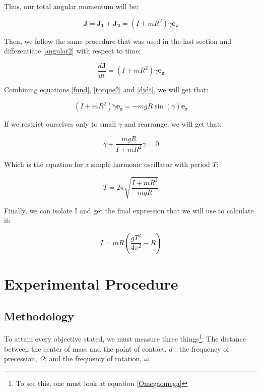 \documentclass[a4paper,12pt]{article}
\begin{document}
Thus, our total angular momentum will be:

\begin{equation}
	\label{angular2}
	\boldsymbol{J} = \boldsymbol{J_1} + \boldsymbol{J_2} = \left(I + mR^2\right) \dot{\gamma} \boldsymbol{e_z} 
\end{equation}

Then, we follow the same procedure that was used in the last section and differentiate \ref{angular2} with respect to time:

\begin{equation}
	\label{djdt}
	\frac{d\boldsymbol{J}}{dt} =\left(I + mR^2\right) \ddot{\gamma} \boldsymbol{e_z}
\end{equation}

Combining equations \eqref{fund}, \eqref{torque2} and \eqref{djdt},  we will get that:

$$\left(I + mR^2\right) \ddot{\gamma} \boldsymbol{e_z} = -mgR \sin(\gamma) \boldsymbol{e_z} $$

If we restrict ourselves only to small $\gamma$ and rearrange, we will get that:

\begin{equation}
	\ddot{\gamma} + \frac{mgR}{I + mR^2} \gamma = 0
\end{equation}

Which is the equation for a simple harmonic oscillator with period $T$:

\begin{equation}
	T = 2\pi\sqrt{\frac{I + mR^2}{mgR}}
\end{equation}

Finally, we can isolate I and get the final expression that we will use to calculate it:

\begin{equation}
	\label{Moment}
	I = mR\left(\frac{g T^2}{4\pi^2} - R\right)
\end{equation}

\section{Experimental Procedure}

\subsection{Methodology}
To attain every objective stated, we must measure three things\footnote{To see this, one must look at equation \eqref{Omegaomega}}:
The distance between the center of mass and the point of contact, $d$ ; the frequency of precession, $\Omega$; and the frequency of rotation, $\omega$.
\end{document}
